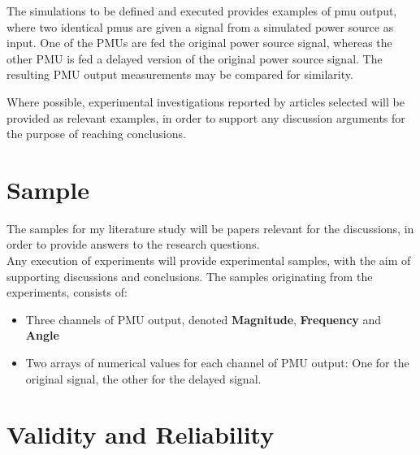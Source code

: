 The simulations to be defined and executed provides examples of \acrlong{pmu} output, where two identical \acrshort{pmu}s are given a signal from a simulated power source as input. One of the PMUs are fed the original power source signal, whereas the other PMU is fed a delayed version of the original power source signal. The resulting PMU output measurements may be compared for similarity. 

Where possible, experimental investigations reported by articles selected will be provided as relevant examples, in order to support any discussion arguments for the purpose of reaching conclusions.  

\section{Sample}

The samples for my literature study will be papers relevant for the discussions, in order to provide answers to the research questions.\\ 

Any execution of experiments will provide experimental samples, with the aim of supporting discussions and conclusions.
The samples originating from the experiments, consists of:
\begin{itemize}
    \item Three channels of PMU output, denoted \textbf{Magnitude}, \textbf{Frequency} and \textbf{Angle} 
    \item Two arrays of numerical values for each channel of PMU output: One for the original signal, the other for the delayed signal. 
\end{itemize}
\section{Validity and Reliability}

